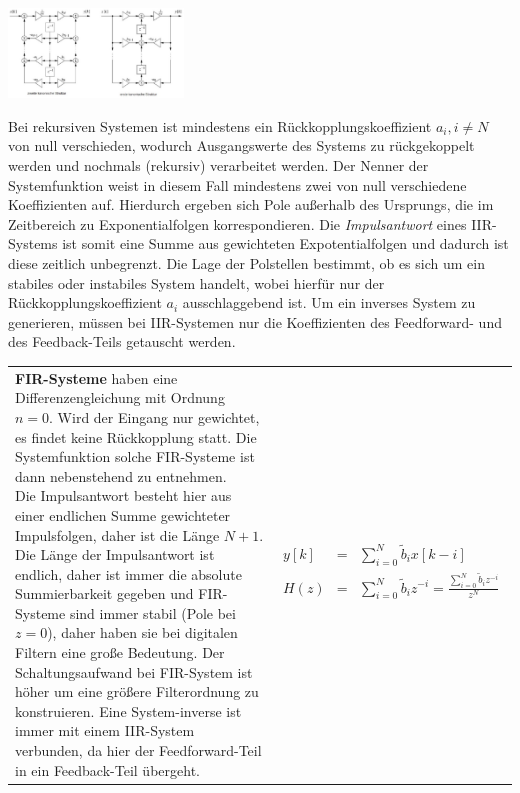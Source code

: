 \begin{multicols}{2}
\begin{center}
\includegraphics[width=0.35\textwidth]{img/IIR-System_2.jpg}
\end{center}
Bei rekursiven Systemen ist mindestens ein Rückkopplungskoeffizient $a_i, i \neq N$ von null verschieden, wodurch Ausgangswerte des Systems zu rückgekoppelt werden und nochmals (rekursiv) verarbeitet werden. Der Nenner der Systemfunktion weist in diesem Fall mindestens zwei von null verschiedene Koeffizienten auf. Hierdurch ergeben sich Pole außerhalb des Ursprungs, die im Zeitbereich zu Exponentialfolgen korrespondieren. Die \textit{Impulsantwort} eines IIR-Systems ist somit eine Summe aus gewichteten Expotentialfolgen und dadurch ist diese zeitlich unbegrenzt. Die Lage der Polstellen bestimmt, ob es sich um ein stabiles oder instabiles System handelt, wobei hierfür nur der Rückkopplungskoeffizient $a_i$ ausschlaggebend ist. Um ein inverses System zu generieren, müssen bei IIR-Systemen nur die Koeffizienten des Feedforward- und des Feedback-Teils getauscht werden.\\
\vspace{24pt}
\begin{tabular}{ll}
 \addtolength{\jot}{2mm}
 \parbox{7cm}{\textbf{FIR-Systeme} haben eine Differenzengleichung mit Ordnung $n = 0$. Wird der Eingang nur gewichtet, es findet keine Rückkopplung statt. Die Systemfunktion solche FIR-Systeme ist dann nebenstehend zu entnehmen.\\~\\
 Die Impulsantwort besteht hier aus einer endlichen Summe gewichteter Impulsfolgen, daher ist die Länge $N+1$. Die Länge der Impulsantwort ist endlich, daher ist immer die absolute Summierbarkeit gegeben und FIR-Systeme sind immer stabil (Pole bei $z=0$), daher haben sie bei digitalen Filtern eine große Bedeutung. Der Schaltungsaufwand bei FIR-System ist höher um eine größere Filterordnung zu konstruieren. Eine System-inverse ist immer mit einem IIR-System verbunden, da hier der Feedforward-Teil in ein Feedback-Teil übergeht.}
 &
 \addtolength{\jot}{2mm}
 \parbox{5cm}{
\begin{eqnarray*}
 y[k] &=& \sum_{i=0}^N \tilde{b}_i x[k-i]\\
 H(z) &=& \sum\limits_{i=0}^N \tilde{b}_i z^{-i} = \frac{\sum\limits_{i=0}^N \tilde{b}_i z^{-i}}{z^N} \\

\end{eqnarray*}}
\end{tabular}
\end{multicols}
